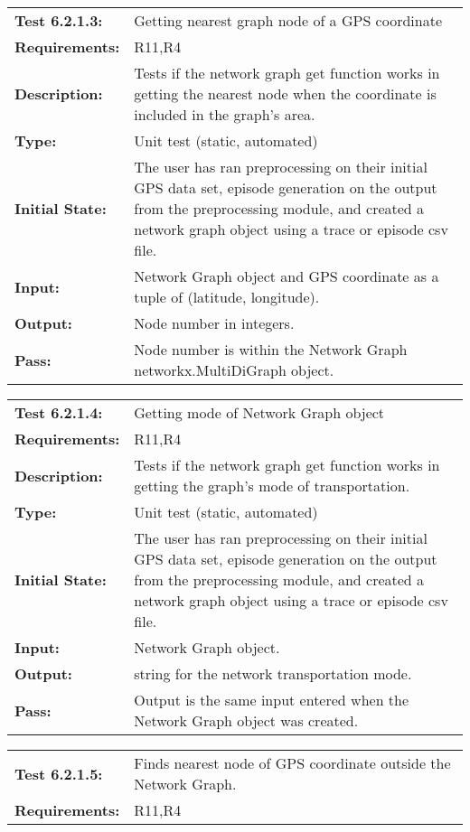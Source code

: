 \documentclass[12pt, titlepage]{article}
\begin{document}
{\begin{tabular}{|l|p{10cm}|}
    \bf{Test} 6.2.1.3: & Getting nearest graph node of a GPS coordinate \\
    \bf{Requirements}: & R11,R4 \\
    \bf{Description}: & Tests if the network graph get function works in getting the nearest node when the coordinate is included in the graph's area. \\
    \bf{Type}: & Unit test (static, automated) \\
    \bf{Initial State}: & The user has ran preprocessing on their initial GPS data set, episode generation on the output from the preprocessing module, and created a network graph object using a trace or episode csv file. \\
    \bf{Input}: & Network Graph object and GPS coordinate as a tuple of (latitude, longitude). \\
    \bf{Output}: & Node number in integers. \\
    \bf{Pass}: & Node number is within the Network Graph networkx.MultiDiGraph object. \\
    \hline
\end{tabular}
\begin{tabular}{|l|p{10cm}|}
    \hline
    \bf{Test} 6.2.1.4: & Getting mode of Network Graph object \\
    \bf{Requirements}: &  R11,R4\\
    \bf{Description}: & Tests if the network graph get function works in getting the graph's mode of transportation. \\
    \bf{Type}: & Unit test (static, automated) \\
    \bf{Initial State}: & The user has ran preprocessing on their initial GPS data set, episode generation on the output from the preprocessing module, and created a network graph object using a trace or episode csv file. \\
    \bf{Input}: & Network Graph object. \\
    \bf{Output}: & string for the network transportation mode. \\
    \bf{Pass}: & Output is the same input entered when the Network Graph object was created. \\
    \hline
\end{tabular}
\begin{tabular}{|l|p{10cm}|}
    \hline
    \bf{Test} 6.2.1.5: & Finds nearest node of GPS coordinate outside the Network Graph. \\
    \bf{Requirements}: &  R11,R4\\

\end{tabular}}
\end{document}
